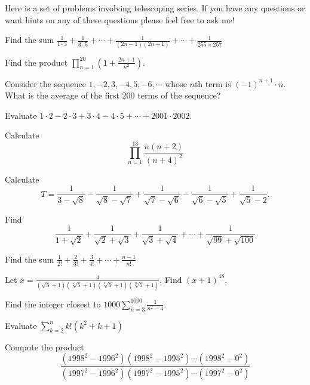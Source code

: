 Here is a set of problems involving telescoping series.  If you have any questions or want hints on any of these questions please feel free to ask me!  

\begin{prob}[AHSME]  Find the sum $\displaystyle \frac{1}{1\cdot 3}+\frac{1}{3\cdot 5}+\cdots+\frac{1}{(2n-1)(2n+1)}+\cdots+\frac{1}{255\times 257}$ \end{prob}
\begin{prob}  Find the product $\displaystyle  \prod_{n=1}^{20}\left(1+\frac{2n+1}{n^2}\right)$.  \end{prob}  
\begin{prob}  Consider the sequence $1, -2, 3, -4, 5, -6, \cdots$ whose $n$th term is $(-1)^{n+1}\cdot n$.  What is the average of the first $200$ terms of the sequence?  \end{prob}  
\begin{prob}[HMMT]  Evaluate $1\cdot 2-2\cdot 3+3\cdot 4-4\cdot 5+\cdots+2001\cdot 2002$.  \end{prob}
\begin{prob}[Mandelbrot]  Calculate $$\prod_{n=1}^{13}\frac{n(n+2)}{(n+4)^2}$$ \end{prob}
\begin{prob}[AHSME]  Calculate $$ T=\frac{1}{3-\sqrt{8}}-\frac{1}{\sqrt{8}-\sqrt{7}}+\frac{1}{\sqrt{7}-\sqrt{6}}-\frac{1}{\sqrt{6}-\sqrt{5}}+\frac{1}{\sqrt{5}-2}. $$ \end{prob}
\begin{prob}  Find $$\frac{1}{1+\sqrt2}+\frac{1}{\sqrt2+\sqrt3}+\frac{1}{\sqrt3+\sqrt4}+\cdots+\frac{1}{\sqrt{99}+\sqrt{100}}$$ \end{prob}
\begin{prob}  Find the sum $\frac{1}{2!}+\frac{2}{3!}+\frac{3}{4!}+\cdots+\frac{n-1}{n!}$ \end{prob}  
\begin{prob}[AIME]  Let $ \displaystyle x=\frac{4}{(\sqrt{5}+1)(\sqrt[4]{5}+1)(\sqrt[8]{5}+1)(\sqrt[16]{5}+1)}. $ Find $ (x+1)^{48}. $ \end{prob}  
\begin{prob}  Find the integer closest to $\displaystyle 1000\sum_{n=3}^{1000}\frac{1}{n^2-4}$.  \end{prob}  
\begin{prob}    Evaluate $\displaystyle \sum_{k=2}^{n}k!(k^2+k+1)$  \end{prob}  
\begin{prob}[Mandelbrot]  Compute the product $$\frac{\left(1998^2-1996^2\right)\left(1998^2-1995^2\right)\cdots \left(1998^2-0^2\right)}{\left(1997^2-1996^2\right)\left(1997^2-1995^2\right)\cdots \left(1997^2-0^2\right)}$$  \end{prob}  
